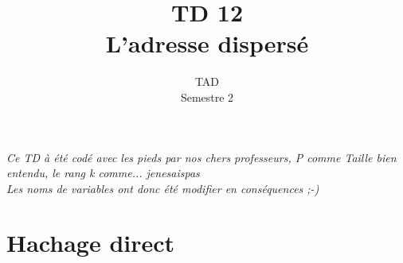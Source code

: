 \documentclass{article}
\title{TD 12\\ L'adresse dispersé}
\date{TAD\\ Semestre 2}
\begin{document}
	\maketitle
	\begin{center}
		\textit{Ce TD à été codé avec les pieds par nos chers professeurs, P comme Taille bien entendu, le rang k comme... jenesaispas \\
		Les noms de variables ont donc été modifier en conséquences ;-)}
	\end{center}
	\section{Hachage direct}
	\subsection{}
		
	\newpage
	\subsection{}
		
	\subsection{}
		
\end{document}
